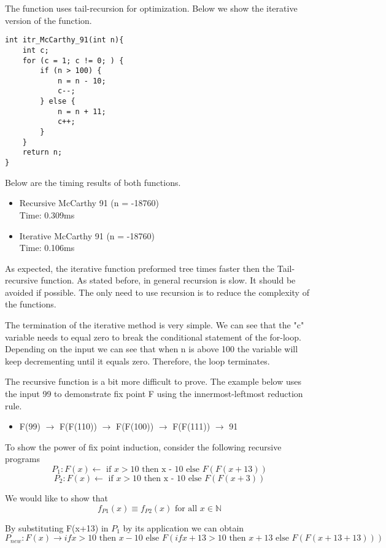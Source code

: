 \documentclass{article}
\begin{document}
The function uses tail-recursion for optimization. Below we show the iterative version of the function. 
\begin{lstlisting}
int itr_McCarthy_91(int n){ 
    int c;
    for (c = 1; c != 0; ) { 
        if (n > 100) {
            n = n - 10; 
            c--;
        } else {
            n = n + 11; 
            c++;
        }   
    }   
    return n;
}
\end{lstlisting}

Below are the timing results of both functions.
\begin{itemize}
\item Recursive McCarthy 91 (n = -18760) \\Time: 0.309ms
\item Iterative McCarthy 91 (n = -18760) \\Time: 0.106ms
\end{itemize}

As expected, the iterative function preformed tree times faster then the Tail-recursive function. As stated before, in general recursion is slow. It should be avoided if possible. The only need to use recursion is to reduce the complexity of the functions. 

The termination of the iterative method is very simple. We can see that the "c" variable needs to equal zero to break the conditional statement of the for-loop. Depending on the input we can see that when n is above 100 the variable will keep decrementing until it equals zero. Therefore, the loop terminates. 

The recursive function is a bit more difficult to prove. The example below uses the input 99 to demonstrate fix point F using the innermost-leftmost reduction rule. 

\begin{itemize}
  \item F(99) $\rightarrow$ F(F(110)) $\rightarrow$  F(F(100)) $\rightarrow$ F(F(111)) $\rightarrow$ 91
\end{itemize}

To show the power of fix point induction, consider the following recursive programs
\[P_1: F(x) \leftarrow \text{ if } x > 10\text{ then x - 10 else }F(F(x+13))\]
\[P_2: F(x) \leftarrow \text{ if } x > 10\text{ then x - 10 else }F(F(x+3))\]

We would like to show that 
\[f_{P1} (x) \equiv f_{P2} (x) \text{ for all } x \in \mathbb{N}\] 

By substituting F(x+13) in $P_1$ by its application we can obtain 
\[P_{new}: F(x) \rightarrow if x > 10 \text{ then } x - 10 \text{ else } F( if x + 13 > 10 \text{ then } x + 13 \text{ else } F(F(x+13 + 13)))\]
\end{document}
